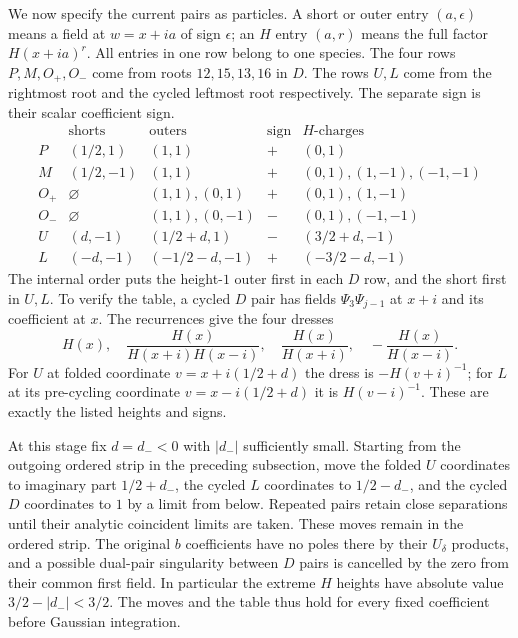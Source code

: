 We now specify the current pairs as particles.  A short or outer entry
$(a,\epsilon)$ means a field at $w=x+ia$ of sign $\epsilon$; an $H$ entry
$(a,r)$ means the full factor $H(x+ia)^r$.  All entries in one row belong to
one species.  The four rows $P,M,O_+,O_-$ come from roots $12,15,13,16$ in
$D$.  The rows $U,L$ come from the rightmost root and the cycled leftmost
root respectively.  The separate sign is their scalar coefficient sign.
\begin{equation}\label{j:particle-list}
\begin{array}{c|c|c|c|l}
 &\text{shorts}&\text{outers}&\text{sign}&H\text{-charges}\\\hline
P &(1/2,1)&(1,1)&+&(0,1)\\
M &(1/2,-1)&(1,1)&+&(0,1),(1,-1),(-1,-1)\\
O_+&\varnothing&(1,1),(0,1)&+&(0,1),(1,-1)\\
O_-&\varnothing&(1,1),(0,-1)&-&(0,1),(-1,-1)\\
U &(d,-1)&(1/2+d,1)&-&(3/2+d,-1)\\
L &(-d,-1)&(-1/2-d,-1)&+&(-3/2-d,-1)
\end{array}
\end{equation}
The internal order puts the height-$1$ outer first in each $D$ row, and the
short first in $U,L$.  To verify the table, a cycled $D$ pair has fields
$\Psi_3\Psi_{j-1}$ at $x+i$ and its coefficient at $x$.  The recurrences
give the four dresses
\[
H(x),\quad \frac{H(x)}{H(x+i)H(x-i)},\quad
\frac{H(x)}{H(x+i)},\quad -\frac{H(x)}{H(x-i)}.
\]
For $U$ at folded coordinate $v=x+i(1/2+d)$ the dress is $-H(v+i)^{-1}$;
for $L$ at its pre-cycling coordinate $v=x-i(1/2+d)$ it is $H(v-i)^{-1}$.
These are exactly the listed heights and signs.

At this stage fix $d=d_-<0$ with $|d_-|$ sufficiently small.  Starting from
the outgoing ordered strip in the preceding subsection, move the folded
$U$ coordinates to imaginary part $1/2+d_-$, the cycled $L$ coordinates to
$1/2-d_-$, and the cycled $D$ coordinates to $1$ by a limit from below.
Repeated pairs retain close separations until their analytic coincident
limits are taken.  These moves remain in the ordered strip.  The original
$b$ coefficients have no poles there by their $U_\delta$ products, and a
possible dual-pair singularity between $D$ pairs is cancelled by the zero
from their common first field.  In particular the extreme $H$ heights have
absolute value $3/2-|d_-|<3/2$.  The moves and the table thus hold for every
fixed coefficient before Gaussian integration.

